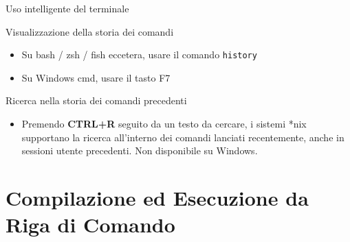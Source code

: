 \documentclass[xcolor=dvipsnames,presentation]{beamer}
\begin{document}
\begin{frame}{Uso intelligente del terminale}
\begin{block}{Visualizzazione della storia dei comandi}
        \scriptsize{}
        \begin{itemize}
             \item Su bash / zsh / fish eccetera, usare il comando \texttt{history}
            \item Su Windows cmd, usare il tasto F7
        \end{itemize}
    \end{block}
    \begin{block}{Ricerca nella storia dei comandi precedenti}
        \scriptsize{}
        \begin{itemize}
            \item Premendo \textbf{CTRL+R} seguito da un testo da cercare, i sistemi *nix supportano la ricerca all'interno dei comandi lanciati recentemente, anche in sessioni utente precedenti. Non disponibile su Windows.
        \end{itemize}
    \end{block}
\end{frame}



\section{Compilazione ed Esecuzione da Riga di Comando}

\end{document}
